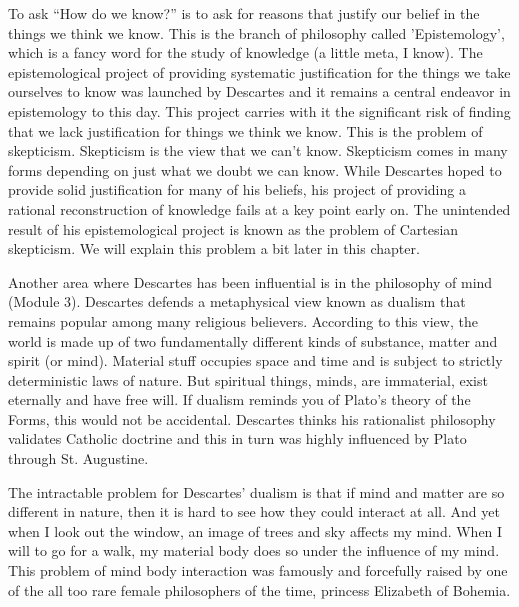 To ask “How do we know?” is to ask for reasons that justify our belief in the things we think we know. This is the branch of philosophy called 'Epistemology', which is a fancy word for the study of knowledge (a little meta, I know). The epistemological project of providing systematic justification for the things we take ourselves to know was launched by Descartes and it remains a central endeavor in epistemology to this day. This project carries with it the significant risk of finding that we lack justification for things we think we know. This is the problem of skepticism. Skepticism is the view that we can’t know. Skepticism comes in many forms depending on just what we doubt we can know. While Descartes hoped to provide solid justification for many of his beliefs, his project of providing a rational reconstruction of knowledge fails at a key point early on. The unintended result of his epistemological project is known as the problem of Cartesian skepticism. We will explain this problem a bit later in this chapter.

Another area where Descartes has been influential is in the philosophy of mind (Module 3). Descartes defends a metaphysical view known as dualism that remains popular among many religious believers. According to this view, the world is made up of two fundamentally different kinds of substance, matter and spirit (or mind). Material stuff occupies space and time and is subject to strictly deterministic laws of nature. But spiritual things, minds, are immaterial, exist eternally and have free will. If dualism reminds you of Plato’s theory of the Forms, this would not be accidental. Descartes thinks his rationalist philosophy validates Catholic doctrine and this in turn was highly influenced by Plato through St. Augustine.

The intractable problem for Descartes’ dualism is that if mind and matter are so different in nature, then it is hard to see how they could interact at all. And yet when I look out the window, an image of trees and sky affects my mind. When I will to go for a walk, my material body does so under the influence of my mind. This problem of mind body interaction was famously and forcefully raised by one of the all too rare female philosophers of the time, princess Elizabeth of Bohemia.

